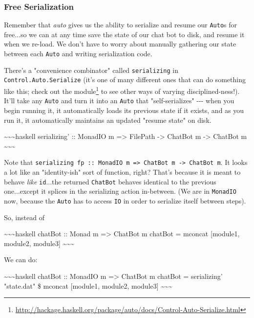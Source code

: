 \documentclass[]{article}
\renewcommand{\href}[2]{#2\footnote{\url{#1}}}
\begin{document}
\subsubsection{Free Serialization}

Remember that \emph{auto} gives us the ability to serialize and resume our
\texttt{Auto}s for free...so we can at any time save the state of our chat bot
to disk, and resume it when we re-load. We don't have to worry about manually
gathering our state between each \texttt{Auto} and writing serialization code.

There's a "convenience combinator" called \texttt{serializing\textquotesingle{}}
in \texttt{Control.Auto.Serialize} (it's one of many different ones that can do
something like this;
\href{http://hackage.haskell.org/package/auto/docs/Control-Auto-Serialize.html}{check
out the module} to see other ways of varying disciplined-ness!). It'll take any
\texttt{Auto} and turn it into an \texttt{Auto} that "self-serializes" -\/-\/-
when you begin running it, it automatically loads its previous state if it
exists, and as you run it, it automatically maintains an updated "resume state"
on disk.

\textasciitilde{}\textasciitilde{}\textasciitilde{}haskell serializing' ::
MonadIO m =\textgreater{} FilePath -\textgreater{} ChatBot m -\textgreater{}
ChatBot m \textasciitilde{}\textasciitilde{}\textasciitilde{}

Note that
\texttt{serializing\textquotesingle{}\ fp\ ::\ MonadIO\ m\ =\textgreater{}\ ChatBot\ m\ -\textgreater{}\ ChatBot\ m}.
It looks a lot like an "identity-ish" sort of function, right? That's because it
is meant to behave \emph{like} \texttt{id}...the returned \texttt{ChatBot}
behaves identical to the previous one...except it splices in the serializing
action in-between. (We are in \texttt{MonadIO} now, because the \texttt{Auto}
has to access \texttt{IO} in order to serialize itself between steps).

So, instead of

\textasciitilde{}\textasciitilde{}\textasciitilde{}haskell chatBot :: Monad m
=\textgreater{} ChatBot m chatBot = mconcat {[}module1, module2, module3{]}
\textasciitilde{}\textasciitilde{}\textasciitilde{}

We can do:

\textasciitilde{}\textasciitilde{}\textasciitilde{}haskell chatBot :: MonadIO m
=\textgreater{} ChatBot m chatBot = serializing' "state.dat" \$ mconcat
{[}module1, module2, module3{]}
\textasciitilde{}\textasciitilde{}\textasciitilde{}
\end{document}
